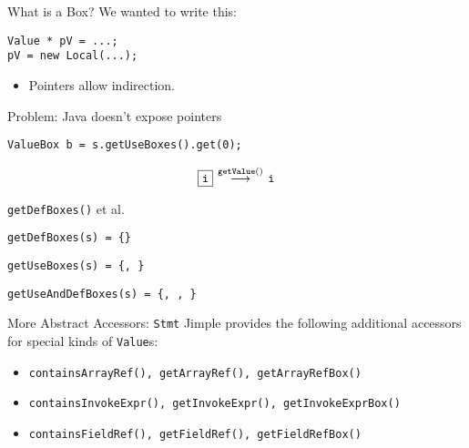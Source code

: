 \begin{slide}{What is a Box?}
We wanted to write this:

\begin{tabbing}
\qquad \= {\tt Value * pV = ...;}\\
       \> {\tt *pV = new Local(...);}
\end{tabbing}


\vspace*{-0.05in}
\begin{itemize}
\item Pointers allow indirection.
\end{itemize}

Problem: Java doesn't expose pointers

\vspace*{0.05in}
\begin{tabbing}
\qquad \= {\tt ValueBox b = s.getUseBoxes().get(0);}\\
\end{tabbing}

\[ \fbox{\tt i} \: \mathop{\longrightarrow}^{\small \tt getValue()} \: \mbox{\tt i} \]

\end{slide}

\begin{slide}{{\tt getDefBoxes()} et al.}

\begin{center}
\end{center}

\quad

{\tt getDefBoxes(s) = \{\}}\\

\quad

{\tt getUseBoxes(s) = \{, \}}\\

\quad

{\tt getUseAndDefBoxes(s) = \{, , \}}\\

\end{slide}

\begin{slide}{More Abstract Accessors: {\tt Stmt}}
Jimple provides the following additional accessors for special kinds of {\tt Value}s:

\begin{itemize}
\item {\tt containsArrayRef(),
 getArrayRef(),~getArrayRefBox()}
\item {\tt containsInvokeExpr(), getInvokeExpr(),~getInvokeExprBox()}
\item {\tt containsFieldRef(), getFieldRef(),~getFieldRefBox()}
\end{itemize}

\end{slide}


